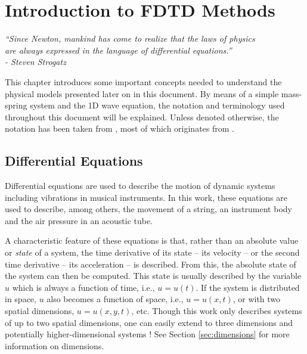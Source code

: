 \chapter{Introduction to FDTD Methods}\label{ch:FDTD}

\begin{flushright}{\it
``Since Newton, mankind has come to realize that the laws of physics\\
are always expressed in the language of differential equations.''\\
- Steven Strogatz} %
\end{flushright}
%
\vspace{2em}
This chapter introduces some important concepts needed to understand the physical models presented later on in this document. 
By means of a simple mass-spring system and the 1D wave equation, the notation and terminology used throughout this document will be explained. 
Unless denoted otherwise, the notation has been taken from \cite{theBible}, most of which originates from \cite{Strikwerda1989}. %

\section{Differential Equations}\label{sec:differentialEquations}
Differential equations are used to describe the motion of dynamic systems including vibrations in musical instruments. In this work, these equations are used to describe, among others, the movement of a string, an instrument body and the air pressure in an acoustic tube.

A characteristic feature of these equations is that, rather than an absolute value or \textit{state} of a system, the time derivative of its state -- its velocity -- or the second time derivative -- its acceleration -- is described. From this, the absolute state of the system can then be computed.
%
This state is usually described by the variable $u$ which is always a function of time, i.e., $u=u(t)$. If the system is distributed in space, $u$ also becomes a function of space, i.e., $u = u(x,t)$, or with two spatial dimensions, $u = u(x,y,t)$, etc. Though this work only describes systems of up to two spatial dimensions, one can easily extend to three dimensions \cite{Hamilton2016} and potentially higher-dimensional systems%
! See Section \ref{sec:dimensions} for more information on dimensions.

